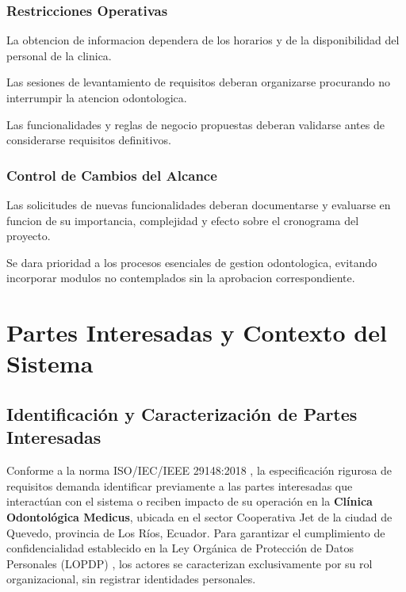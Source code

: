 \documentclass[12pt,a4paper]{article}
\begin{document}
\subsubsection{Restricciones Operativas}

La obtencion de informacion dependera de los
horarios y de la disponibilidad del personal
de la clinica.

Las sesiones de levantamiento de requisitos
deberan organizarse procurando no interrumpir
la atencion odontologica.

Las funcionalidades y reglas de negocio
propuestas deberan validarse antes de
considerarse requisitos definitivos.

\subsubsection{Control de Cambios del Alcance}

Las solicitudes de nuevas funcionalidades
deberan documentarse y evaluarse en funcion
de su importancia, complejidad y efecto
sobre el cronograma del proyecto.

Se dara prioridad a los procesos esenciales
de gestion odontologica, evitando incorporar
modulos no contemplados sin la aprobacion
correspondiente.





\section{Partes Interesadas y Contexto del Sistema}

\subsection{Identificación y Caracterización de Partes Interesadas}

Conforme a la norma ISO/IEC/IEEE 29148:2018 \cite{iso29148}, la especificación rigurosa de requisitos demanda identificar previamente a las partes interesadas que interactúan con el sistema o reciben impacto de su operación en la \textbf{Clínica Odontológica Medicus}, ubicada en el sector Cooperativa Jet de la ciudad de Quevedo, provincia de Los Ríos, Ecuador. Para garantizar el cumplimiento de confidencialidad establecido en la Ley Orgánica de Protección de Datos Personales (LOPDP) \cite{lopdp2021}, los actores se caracterizan exclusivamente por su rol organizacional, sin registrar identidades personales.
\end{document}
